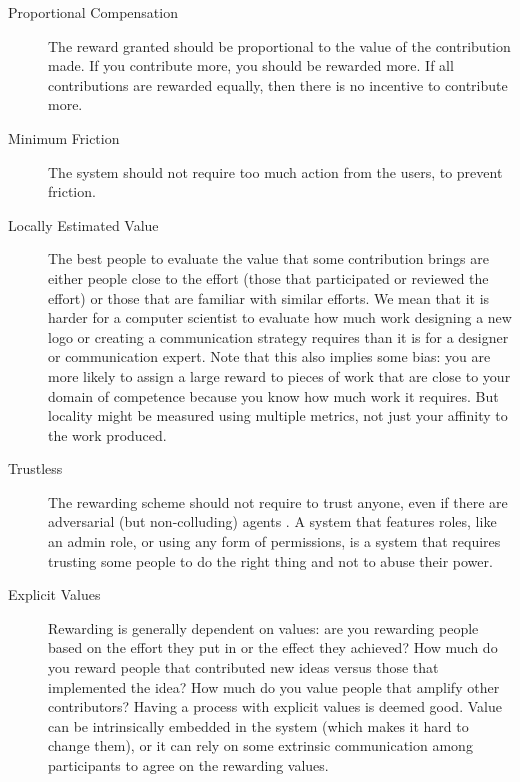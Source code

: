 \begin{description}
	\item[Proportional Compensation]
		The reward granted should be proportional to the value of the contribution made.
		If you contribute more, you should be rewarded more.
		If all contributions are rewarded equally, then there is no incentive to contribute more.
	\item[Minimum Friction]
		The system should not require too much action from the users, to prevent friction.
  \item[Locally Estimated Value]
    The best people to evaluate the value that some contribution brings are either people close to the effort (those that participated or reviewed the effort) or those that are familiar with similar efforts.
    We mean that it is harder for a computer scientist to evaluate how much work designing a new logo or creating a communication strategy requires than it is for a designer or communication expert.
    Note that this also implies some bias: you are more likely to assign a large reward to pieces of work that are close to your domain of competence because you know how much work it requires.
    But locality might be measured using multiple metrics, not just your affinity to the work produced.
  \item[Trustless]
    The rewarding scheme should not require to trust anyone, even if there are adversarial (but non-colluding) agents%
    .
    A system that features roles, like an admin role, or using any form of permissions, is a system that requires trusting some people to do the right thing and not to abuse their power.
  \item[Explicit Values]
    Rewarding is generally dependent on values: are you rewarding people based on the effort they put in or the effect they achieved?
    How much do you reward people that contributed new ideas versus those that implemented the idea?
    How much do you value people that amplify other contributors?
    Having a process with explicit values is deemed good.
    Value can be intrinsically embedded in the system (which makes it hard to change them), or it can rely on some extrinsic communication among participants to agree on the rewarding values.
\end{description}

